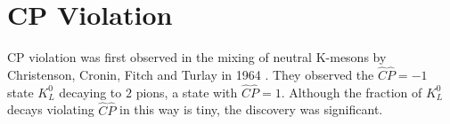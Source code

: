 \section{CP Violation}

CP violation was first observed in the mixing of neutral K-mesons by Christenson, Cronin, Fitch and Turlay in 1964 \cite{FirstCPV}. They observed the $\hat{C}\hat{P} = -1$ state $K^{0}_L$ decaying to $2$ pions, a state with $\hat{C}\hat{P} = 1$. Although the fraction of $K^{0}_L$ decays violating $\hat{C}\hat{P}$ in this way is tiny, the discovery was significant.     
